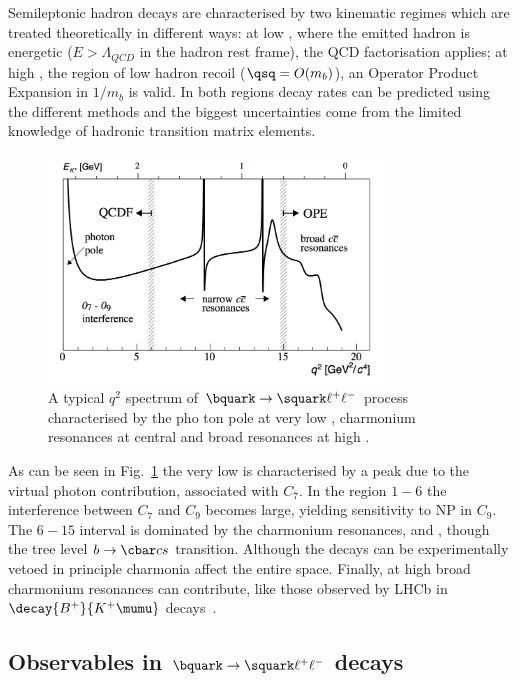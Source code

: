 Semileptonic \bquark hadron decays are characterised by two kinematic regimes which
are treated theoretically in different ways: at low \qsq, where the emitted hadron is energetic 
($E > \Lambda_{QCD}$ in the \bquark hadron rest frame), the QCD factorisation applies;
at high \qsq, the region of low hadron recoil ($\qsq = O(m_b)$), an Operator Product Expansion
in $1/m_b$ is valid. In both regions decay rates can be predicted using the different methods and
the biggest uncertainties come from the limited knowledge of hadronic transition matrix elements.
%
\begin{figure}[h!]
\centering
\includegraphics[width=0.8\textwidth]{fig/q2spectrum.png}
\caption{A typical $q^2$ spectrum of $\bquark\to\squark\ell^+\ell^-$ process characterised by the pho
ton pole
at very low \qsq, charmonium resonances at central \qsq and broad resonances at high \qsq.}
\label{fig:q2spectrum}
\end{figure}
%
As can be seen in Fig.~\ref{fig:q2spectrum} the very low \qsq is characterised by a peak due
to the virtual photon contribution, associated with $C_7$. In the region $1-6$ \gevgevcccc the 
interference between $C_7$ and $C_9$ becomes large, yielding sensitivity to NP in $C_9$.
The $6-15$ \gevgevcccc interval is dominated by the charmonium resonances, \jpsi and \psitwos,
though the tree level $b\to\cbar c s$ transition. Although the decays can be experimentally vetoed in
principle charmonia affect the entire \qsq space. Finally, at high \qsq broad charmonium resonances can contribute, like those observed by LHCb in $\decay{B^+}{K^+\mumu}$ decays~\cite{LHCB-PAPER-2013-039}.

\subsection{Observables in $\bquark\to\squark\ell^+\ell^-$ decays}
\label{sec:observables}

